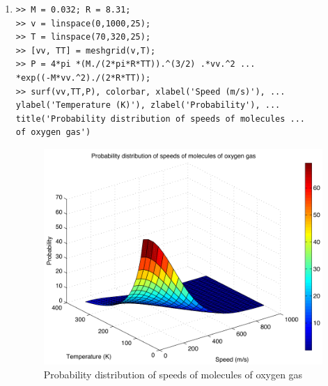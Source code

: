 \begin{enumerate}
\clearpage
\item
\begin{lstlisting}
>> M = 0.032; R = 8.31;
>> v = linspace(0,1000,25);
>> T = linspace(70,320,25);
>> [vv, TT] = meshgrid(v,T);
>> P = 4*pi *(M./(2*pi*R*TT)).^(3/2) .*vv.^2 ...
*exp((-M*vv.^2)./(2*R*TT));
>> surf(vv,TT,P), colorbar, xlabel('Speed (m/s)'), ...
ylabel('Temperature (K)'), zlabel('Probability'), ...
title('Probability distribution of speeds of molecules ... 
of oxygen gas')
\end{lstlisting}
\begin{figure}[h]
	\myfloatalign
	\includegraphics[width=\linewidth]{Graphics/Additional-Ex/3D-oxygen-plot}
	\caption{Probability distribution of speeds of molecules of oxygen gas}
	\label{fig:3D-oxygen-plot}
\end{figure}


\end{enumerate}
